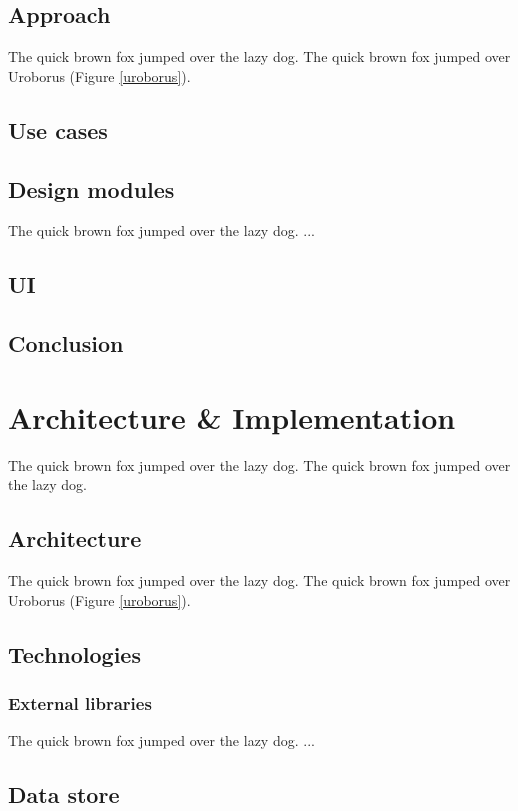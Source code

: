 \documentclass{l4proj}
\begin{document}
\section{Approach}
The quick brown fox jumped over the lazy dog.
The quick brown fox jumped over Uroborus (Figure \ref{uroborus}).

\section{Use cases}

\section{Design modules}
The quick brown fox jumped over the lazy dog.
...

\section{UI}

\section{Conclusion}

\chapter{Architecture \& Implementation}
The quick brown fox jumped over the lazy dog.
The quick brown fox jumped over the lazy dog.

\section{Architecture}
The quick brown fox jumped over the lazy dog.
The quick brown fox jumped over Uroborus (Figure \ref{uroborus}).

\section{Technologies}

\subsection{External libraries}
The quick brown fox jumped over the lazy dog.
...

\section{Data store}
\end{document}
